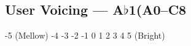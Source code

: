 \subsection[User Voicing]{User Voicing --- \UiKey{\I}\UiKey{\SET}A$\flat$1(A0--C8}




































-5 (Mellow)
-4
-3
-2
-1
0
1
2
3
4
5 (Bright)

